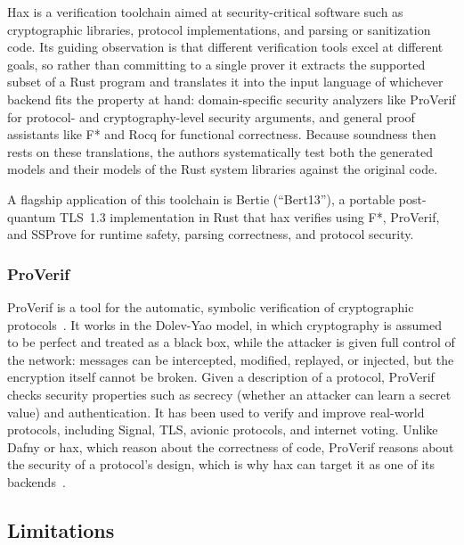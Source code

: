 \documentclass[conference]{IEEEtran}
\begin{document}
Hax is a verification toolchain aimed at security-critical software such as cryptographic libraries, protocol implementations, and parsing or sanitization code. Its guiding observation is that different verification tools excel at different goals, so rather than committing to a single prover it extracts the supported subset of a Rust program and translates it into the input language of whichever backend fits the property at hand: domain-specific security analyzers like ProVerif for protocol- and cryptography-level security arguments, and general proof assistants like F* and Rocq for functional correctness. Because soundness then rests on these translations, the authors systematically test both the generated models and their models of the Rust system libraries against the original code. \cite{bhargavan2025hax}

A flagship application of this toolchain is Bertie (``Bert13''), a portable post-quantum TLS~1.3 implementation in Rust that hax verifies using F*, ProVerif, and SSProve for runtime safety, parsing correctness, and protocol security. \cite{bhargavan2025bertie}

\subsubsection{\textbf{ProVerif}}

ProVerif is a tool for the automatic, symbolic verification of cryptographic protocols~\cite{blanchet2001proverif, proverif_web}. It works in the Dolev-Yao model, in which cryptography is assumed to be perfect and treated as a black box, while the attacker is given full control of the network: messages can be intercepted, modified, replayed, or injected, but the encryption itself cannot be broken. Given a description of a protocol, ProVerif checks security properties such as secrecy (whether an attacker can learn a secret value) and authentication. It has been used to verify and improve real-world protocols, including Signal, TLS, avionic protocols, and internet voting. Unlike Dafny or hax, which reason about the correctness of code, ProVerif reasons about the security of a protocol's design, which is why hax can target it as one of its backends~\cite{bhargavan2025hax}.

\subsection{Limitations}
\end{document}

